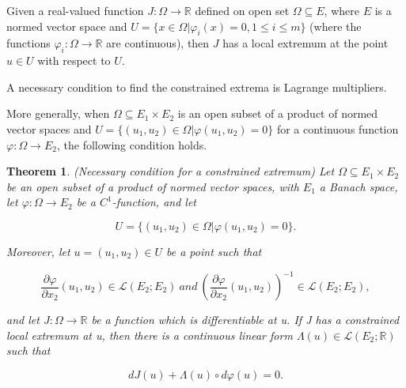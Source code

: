\documentclass[a4paper,12pt]{report}
\newtheorem{theorem}{Theorem}[section]
\begin{document}
Given a real-valued function $J:\Omega\to\mathbb R$ defined on open set $\Omega\subseteq E$, where $E$ is a normed vector space and $U=\{x\in\Omega | \varphi_i(x)=0, 1\leq i\leq m\}$ (where the functions $\varphi_i:\Omega\to\mathbb R$ are continuous), then $J$ has a local extremum at the point $u\in U$ with respect to $U$.

A necessary condition to find the constrained extrema is Lagrange multipliers.

More generally, when $\Omega\subseteq E_1\times E_2$ is an open subset of a product of normed vector spaces and $U=\{(u_1,u_2)\in\Omega | \varphi(u_1,u_2)=0\}$ for a continuous function $\varphi:\Omega\to E_2$, the following condition holds.

\begin{theorem}
    (Necessary condition for a constrained extremum) Let $\Omega\subseteq E_1 \times E_2$ be an open subset of a product of normed vector spaces, with $E_1$ a Banach space, let $\varphi: \Omega\to E_2$ be a $C^1$-function, and let

    \[
        U=\{(u_1,u_2)\in \Omega | \varphi (u_1, u_2)=0\}.
    \]

    Moreover, let $u=(u_1,u_2)\in U$ be a point such that

    \[
        \frac{\partial \varphi}{\partial x_2}(u_1,u_2)\in \mathcal L (E_2;E_2)\ and\ \left(\frac{\partial \varphi}{\partial x_2}(u_1,u_2)\right)^{-1}\in \mathcal L (E_2;E_2),
    \]

    and let $J : \Omega \to \mathbb R $ be a function which is differentiable at u. If J has a constrained local extremum at u, then there is a continuous linear form $\Lambda(u)\in\mathcal L (E_2;\mathbb R)$ such that

    \[
        dJ(u)+\Lambda(u)\circ d\varphi(u)=0.
    \]

\end{theorem}
\end{document}
